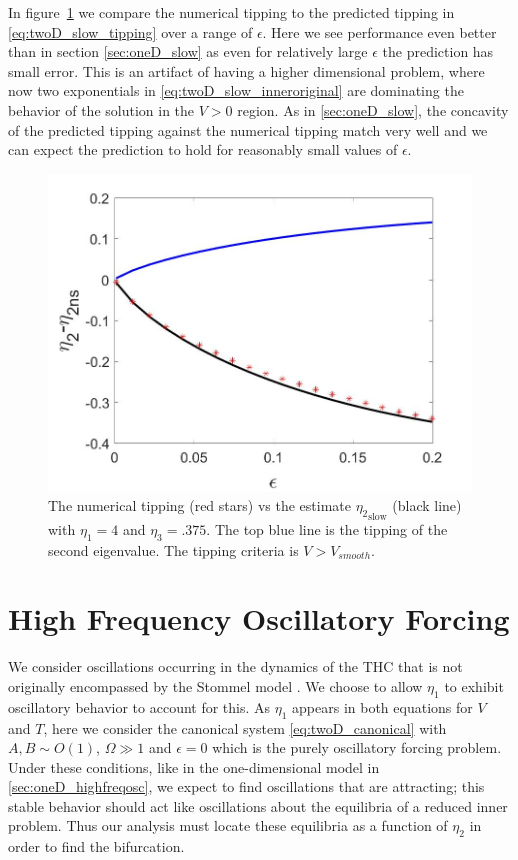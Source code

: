 In figure~\ref{fig:twoD_slow_epscomp} we compare the numerical tipping to the predicted tipping in \eqref{eq:twoD_slow_tipping} over a range of $\epsilon$. Here we see performance even better than in section \autoref{sec:oneD_slow} as even for relatively large $\epsilon$ the prediction has small error. This is an artifact of having a higher dimensional problem, where now two exponentials in \eqref{eq:twoD_slow_inneroriginal} are dominating the behavior of the solution in the $V>0$ region. As in \autoref{sec:oneD_slow}, the concavity of the predicted tipping against the numerical tipping match very well and we can expect the prediction to hold for reasonably small values of $\epsilon$.

\begin{figure}[H]
\centering
\includegraphics[width=\linewidth]{twoD/slow_epscomp.jpg}
\caption{The numerical tipping (red stars) vs the estimate ${\eta_2}_{\text{slow}}$ (black line) with $\eta_1=4$ and $\eta_3=.375$. The top blue line is the tipping of the second eigenvalue. The tipping criteria is $V>V_{smooth}$.}
\label{fig:twoD_slow_epscomp}
\end{figure}

\section{High Frequency Oscillatory Forcing}
\label{sec:twoD_highfreqosc}

We consider oscillations occurring in the dynamics of the THC that is not originally encompassed by the Stommel model \cite{alley2003abrupt,huybers2005obliquity,marotzke2000abrupt,rahmstorf2000thermohaline,rahmstorf2002ocean,stastna2007box}. We choose to allow $\eta_1$ to exhibit oscillatory behavior to account for this. As $\eta_1$ appears in both equations for $V$ and $T$, here we consider the canonical system \eqref{eq:twoD_canonical} with $A,B\sim O(1)$, $\Omega\gg 1$ and $\epsilon=0$ which is the purely oscillatory forcing problem. Under these conditions, like in the one-dimensional model in \autoref{sec:oneD_highfreqosc}, we expect to find oscillations that are attracting; this stable behavior should act like oscillations about the equilibria of a reduced inner problem. Thus our analysis must locate these equilibria as a function of $\eta_2$ in order to find the bifurcation.

